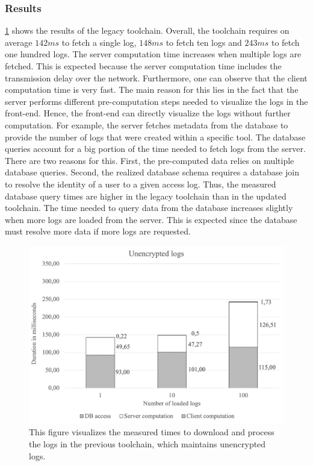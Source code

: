 \documentclass[../main.tex]{subfiles}
\begin{document}
\subsubsection{Results}
\cref{fig:perf-unencrypted} shows the results of the legacy toolchain.
Overall, the toolchain requires on average $142ms$ to fetch a single log, $148ms$ to fetch ten logs and $243ms$ to fetch one hundred logs.
The server computation time increases when multiple logs are fetched.
This is expected because the server computation time includes the transmission delay over the network.
Furthermore, one can observe that the client computation time is very fast.
The main reason for this lies in the fact that the server performs different pre-computation steps needed to visualize the logs in the front-end.
Hence, the front-end can directly visualize the logs without further computation.
For example, the server fetches metadata from the database to provide the number of logs that were created within a specific tool.
The database queries account for a big portion of the time needed to fetch logs from the server.
There are two reasons for this.
First, the pre-computed data relies on multiple database queries.
Second, the realized database schema requires a database join to resolve the identity of a user to a given access log.
Thus, the measured database query times are higher in the legacy toolchain than in the updated toolchain.
The time needed to query data from the database increases slightly when more logs are loaded from the server.
This is expected since the database must resolve more data if more logs are requested.

\begin{figure}[ht]
    \includegraphics[scale=0.62]{../img/07/unencrypted.png}
    \centering
    \caption[Measurements legacy toolchain]{This figure visualizes the measured times to download and process the logs in the previous toolchain, which maintains unencrypted logs.}
    \label{fig:perf-unencrypted}
\end{figure}
\end{document}
